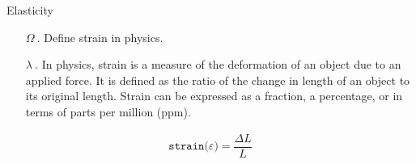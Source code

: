 \documentclass{article}
\begin{document}
\ttfamily
\sloppy
\begin{center}
Elasticity
\end{center}

\vspace*{\fill}
\begin{itemize}
	\item[\textcolor{PINKD}{$\Omega ~.$}]\textcolor{PINKD}{Define strain in physics.}

	\item[\textcolor{GRAY20}{$\lambda ~.$}]\textcolor{GRAY20}{In physics, strain is a measure of the deformation of an object due to an applied force. It is defined as the ratio of the change in length of an object to its original length. Strain can be expressed as a fraction, a percentage, or in terms of parts per million (ppm).}
\end{itemize}
\vspace*{\fill}

\begin{center}
\def\Rx{0.15}   %
\def\Ry{0.40}   %
\def\L{3}     %
\def\F{0.28*\L} %
\end{center}
\vspace*{\fill}
\begin{align*}
\texttt{strain($\varepsilon$)} = \dfrac{\Delta L}{L}
\end{align*}
\end{document}
